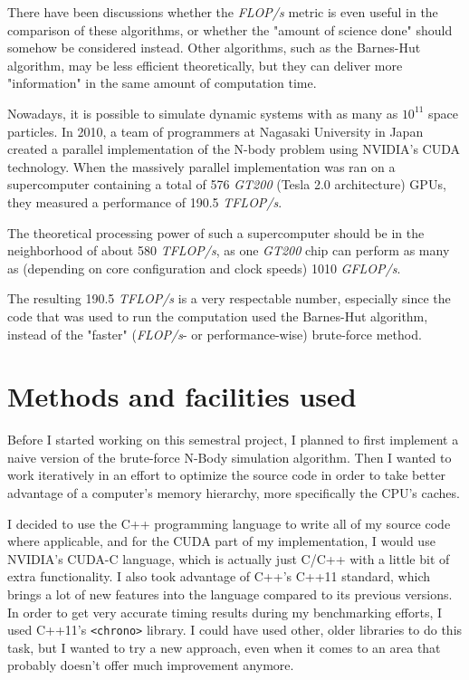 \documentclass[journal]{IEEEtran}
\begin{document}
		There have been discussions whether the \textit{FLOP/s} metric is even useful in the comparison of these algorithms, or whether the "amount of science done" should somehow be considered instead. Other algorithms, such as the Barnes-Hut algorithm, may be less efficient theoretically, but they can deliver more "information" in the same amount of computation time.
		
		Nowadays, it is possible to simulate dynamic systems with as many as $10^{11}$ space particles. In 2010, a team of programmers at Nagasaki University in Japan created a parallel implementation of the N-body problem using NVIDIA’s CUDA technology. When the massively parallel implementation was ran on a supercomputer containing a total of 576 \textit{GT200} (Tesla 2.0 architecture) GPUs, they measured a performance of 190.5 \textit{TFLOP/s}. \cite{teraflops}
		
		The theoretical processing power of such a supercomputer should be in the neighborhood of about 580 \textit{TFLOP/s}, as one \textit{GT200} chip can perform as many as (depending on core configuration and clock speeds) 1010 \textit{GFLOP/s}.\cite{wikitesla}
		
		The resulting 190.5 \textit{TFLOP/s} is a very respectable number, especially since the code that was used to run the computation used the Barnes-Hut algorithm, instead of the "faster" (\textit{FLOP/s}- or performance-wise) brute-force method.
		
	\section{Methods and facilities used}
	
		Before I started working on this semestral project, I planned to first implement a naive version of the brute-force N-Body simulation algorithm. Then I wanted to work iteratively in an effort to optimize the source code in order to take better advantage of a computer's memory hierarchy, more specifically the CPU's caches. 
		
		I decided to use the C++ programming language to write all of my source code where applicable, and for the CUDA part of my implementation, I would use NVIDIA's CUDA-C language, which is actually just C/C++ with a little bit of extra functionality. I also took advantage of C++'s C++11 standard, which brings a lot of new features into the language compared to its previous versions. In order to get very accurate timing results during my benchmarking efforts, I used C++11's \texttt{<chrono>} library. I could have used other, older libraries to do this task, but I wanted to try a new approach, even when it comes to an area that probably doesn't offer much improvement anymore.
		
\end{document}
